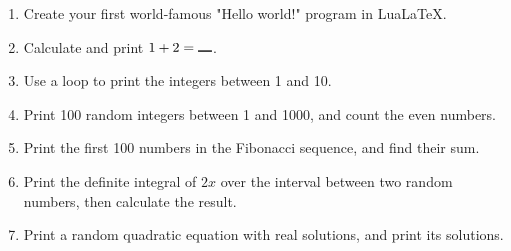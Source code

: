 \documentclass{article}
\begin{document}
\begin{enumerate}
    \item Create your first world-famous "Hello world!" program in LuaLaTeX.
    \item Calculate and print $1 + 2 = \rule{1em}{1pt}$.
    \item Use a loop to print the integers between 1 and 10.
    \item Print 100 random integers between 1 and 1000, and count the even numbers.
    \item Print the first 100 numbers in the Fibonacci sequence, and find their sum.
    \item Print the definite integral of $2x$ over the interval between two random numbers, then calculate the result.
    \item Print a random quadratic equation with real solutions, and print its solutions.
\end{enumerate}
\end{document}
